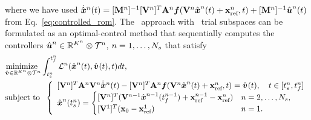 where we have used $ \dot{\hat{ \boldsymbol x}}^{n}(t) = [\mathbf{M}^{n}]^{-1}[\mathbf {V}^{n}]^T
\mathbf{A}^{n} \boldsymbol f(\mathbf {V}^{n} \hat{ \boldsymbol x}^{n}(t) +
\mathbf{x}_\text{ref}^{n} ,t) + [\mathbf{M}^{n}]^{-1}\hat{\boldsymbol u}^{n}(t) 
$ from Eq.~\eqref{eq:controlled_rom}.
The \methodAcronym\ approach with \spatialAcronym\ trial subspaces can be formulated as an optimal-control
method that sequentially computes the controllers ${\hat{\boldsymbol u}^{n}}
\in \mathbb{R}^{K^{n}} \otimes \mathcal{T}^{n}
$, $n=1,\ldots,N_s$ that satisfy
\begin{equation}\label{eq:tclspg_oc1a} 
\begin{split}
&\underset{\controllerDumArgnt{} \in \RR{\romdimArg{n}}\otimes \timeSpaceArg{n} }{\text{minimize } } 
\int_{\timeStartArg{n}}^{\timeEndArg{n}}
\objectiveControlArg{n}(\genstateArg{n}{t},\controllerDumArg{}{t},t)dt, 
 \\
&\text{subject to } \;  \left\{\begin{array}{l} 
 \basisspaceTArg{n} \stweightingMatArgt{n}{t}
\basisspaceArg{n}  \genstateDotArg{n}{t}  - \basisspaceTArg{n}
\stweightingMatArgt{n}{t} \velocity(\veloargsromn)
	=\controllerDumArg{}{t},\quad t\in[\timeStartArg{n},\timeEndArg{n}] \\
 \genstateArg{n}{\timeStartArg{n}} =
\begin{cases} \spatialIC  & n = 2,\ldots,\nslabs,
 \\ \genstateICOne & n=1. \end{cases} \end{array} \right.
\end{split}
\end{equation}

